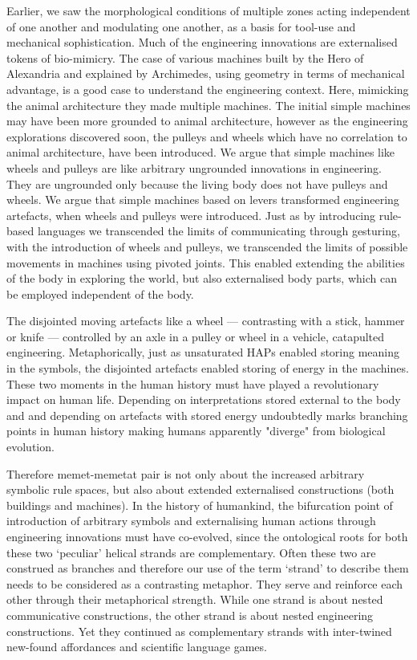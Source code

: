 Earlier, we saw the morphological conditions of multiple zones acting independent of one another and modulating one another, as a basis for tool-use and mechanical sophistication. Much of the engineering innovations are externalised tokens of bio-mimicry. The case of various machines built by the Hero of Alexandria and explained by Archimedes, using geometry in terms of mechanical advantage, is a good case to understand the engineering context. Here, mimicking the animal architecture they made multiple machines. The initial simple machines may have been more grounded to animal architecture, however as the engineering explorations discovered soon, the pulleys and wheels which have no correlation to animal architecture, have been introduced. We argue that simple machines like wheels and pulleys are like arbitrary ungrounded innovations in engineering. They are ungrounded only because the living body does not have pulleys and wheels. We argue that simple machines based on levers transformed engineering artefacts, when wheels and pulleys were introduced. Just as by introducing rule-based languages we transcended the limits of communicating through gesturing, with the introduction of wheels and pulleys, we transcended the limits of possible movements in machines using pivoted joints. This enabled extending the abilities of the body in exploring the world, but also externalised body parts, which can be employed independent of the body.

The disjointed moving artefacts like a wheel --- contrasting with a stick, hammer or knife --- controlled by an axle in a pulley or wheel in a vehicle, catapulted engineering. Metaphorically, just as unsaturated HAPs enabled storing meaning in the symbols, the disjointed artefacts enabled storing of energy in the machines. These two moments in the human history must have played a revolutionary impact on human life. Depending on interpretations stored external to the body and and depending on artefacts with stored energy undoubtedly marks branching points in human history making humans apparently "diverge" from biological evolution.

Therefore memet-memetat pair is not only about the increased arbitrary symbolic rule spaces, but also about extended externalised constructions (both buildings and machines). In the history of humankind, the bifurcation point of introduction of arbitrary symbols and externalising human actions through engineering innovations must have co-evolved, since the ontological roots for both these two `peculiar' helical strands are complementary. Often these two are construed as branches and therefore our use of the term `strand' to describe them needs to be considered as a contrasting metaphor. They serve and reinforce each other through their metaphorical strength. While one strand is about nested communicative constructions, the other strand is about nested engineering constructions. Yet they continued as complementary strands with inter-twined new-found affordances and scientific language games.

